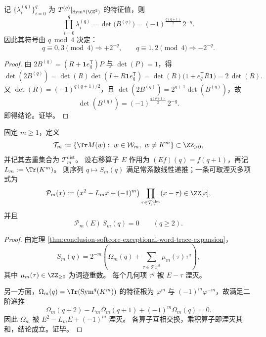\begin{corollary}\label{cor:conclusion-softcore-spectrum-product-sign-law}
记 \(\{\lambda_i^{(q)}\}_{i=0}^{q}\) 为
\(
T^{(q)}|_{\operatorname{Sym}^q(\CC^2)}
\)
的特征值，则
\[
\prod_{i=0}^{q}\lambda_i^{(q)}
=\det\bigl(B^{(q)}\bigr)
=(-1)^{\frac{q(q+1)}{2}}\,2^{-q}.
\]
因此其符号由 \(q\bmod 4\) 决定：
\[
q\equiv 0,3\pmod 4\Rightarrow +2^{-q},
\qquad
q\equiv 1,2\pmod 4\Rightarrow -2^{-q}.
\]
\end{corollary}
\begin{proof}
由
\(
2B^{(q)}=(R+\mathbf 1e_q^{\mathsf T})P
\)
与 \(\det(P)=1\)，得
\[
\det(2B^{(q)})
=\det(R)\det(I+R\mathbf 1e_q^{\mathsf T})
=\det(R)\bigl(1+e_q^{\mathsf T}R\mathbf 1\bigr)
=2\,\det(R).
\]
又 \(\det(R)=(-1)^{q(q+1)/2}\)，且 \(\det(2B^{(q)})=2^{q+1}\det(B^{(q)})\)，故
\[
\det(B^{(q)})
=(-1)^{\frac{q(q+1)}{2}}\,2^{-q}.
\]
即得结论。证毕。
\end{proof}



\begin{proposition}\label{prop:conclusion-softcore-fixedm-qrecurrence-annihilator}
固定 \(m\ge 1\)，定义
\[
\mathcal T_m:=\{\Tr M(w):\ w\in\mathcal W_m,\ w\neq K^m\}\subset\ZZ_{>0},
\]
并记其去重集合为 \(\mathcal T_m^{\mathrm{dist}}\)。
设右移算子 \(E\) 作用为 \((Ef)(q)=f(q+1)\)，再记 \(L_m:=\Tr(K^m)\)。
则序列 \(q\mapsto S_m(q)\) 满足常系数线性递推；一条可取湮灭多项式为
\[
\mathcal P_m(x):=
\bigl(x^2-L_mx+(-1)^m\bigr)
\prod_{\tau\in\mathcal T_m^{\mathrm{dist}}}(x-\tau)\in\ZZ[x],
\]
并且
\[
\mathcal P_m(E)\,S_m(q)=0\qquad(q\ge 2).
\]
\end{proposition}
\begin{proof}
由定理 \ref{thm:conclusion-softcore-exceptional-word-trace-expansion}，
\[
S_m(q)
=2^{-m}\left(
\Omega_m(q)+
\sum_{\tau\in\mathcal T_m^{\mathrm{dist}}}\mu_m(\tau)\tau^q
\right),
\]
其中 \(\mu_m(\tau)\in\ZZ_{\ge 0}\) 为词迹重数。
每个几何项 \(\tau^q\) 被 \(E-\tau\) 湮灭。

另一方面，\(\Omega_m(q)=\Tr(\operatorname{Sym}^q(K^m))\) 的特征根为
\(\varphi^m\) 与 \((-1)^m\varphi^{-m}\)，故满足二阶递推
\[
\Omega_m(q+2)-L_m\Omega_m(q+1)+(-1)^m\Omega_m(q)=0.
\]
因此 \(\Omega_m\) 被 \(E^2-L_mE+(-1)^m\) 湮灭。
各算子互相交换，乘积算子即湮灭其和，结论成立。证毕。
\end{proof}

